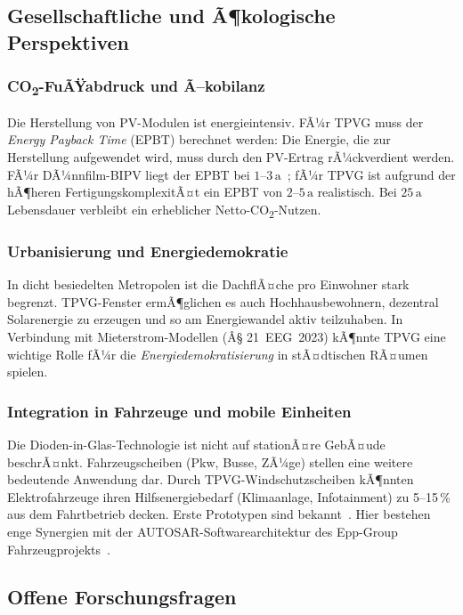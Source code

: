 ﻿\documentclass[a4paper,12pt]{article}
\theoremstyle{definition}
\theoremstyle{remark}
\begin{document}
\subsection{Gesellschaftliche und Ã¶kologische Perspektiven}

\subsubsection{CO\textsubscript{2}-FuÃŸabdruck und Ã–kobilanz}
Die Herstellung von PV-Modulen ist energieintensiv. FÃ¼r TPVG muss
der \emph{Energy Payback Time} (EPBT) berechnet werden: Die
Energie, die zur Herstellung aufgewendet wird, muss durch den PV-Ertrag
rÃ¼ckverdient werden. FÃ¼r DÃ¼nnfilm-BIPV liegt der EPBT bei
$1$--$3\,\mathrm{a}$~\cite{NREL2014}; fÃ¼r TPVG ist aufgrund der
hÃ¶heren FertigungskomplexitÃ¤t ein EPBT von $2$--$5\,\mathrm{a}$
realistisch. Bei $25\,\mathrm{a}$ Lebensdauer verbleibt ein erheblicher
Netto-CO\textsubscript{2}-Nutzen.

\subsubsection{Urbanisierung und Energiedemokratie}
In dicht besiedelten Metropolen ist die DachflÃ¤che pro Einwohner
stark begrenzt. TPVG-Fenster ermÃ¶glichen es auch Hochhausbewohnern,
dezentral Solarenergie zu erzeugen und so am Energiewandel aktiv
teilzuhaben. In Verbindung mit Mieterstrom-Modellen (Â§ 21~EEG~2023)
kÃ¶nnte TPVG eine wichtige Rolle fÃ¼r die \emph{Energiedemokratisierung}
in stÃ¤dtischen RÃ¤umen spielen.

\subsubsection{Integration in Fahrzeuge und mobile Einheiten}
Die Dioden-in-Glas-Technologie ist nicht auf stationÃ¤re GebÃ¤ude
beschrÃ¤nkt. Fahrzeugscheiben (Pkw, Busse, ZÃ¼ge) stellen eine
weitere bedeutende Anwendung dar. Durch TPVG-Windschutzscheiben
kÃ¶nnten Elektrofahrzeuge ihren Hilfsenergiebedarf (Klimaanlage,
Infotainment) zu 5--15\,\% aus dem Fahrtbetrieb decken.
Erste Prototypen sind bekannt~\cite{Toyota2023}. Hier bestehen enge
Synergien mit der AUTOSAR-Softwarearchitektur des Epp-Group
Fahrzeugprojekts~\cite{Epp2026AUTOSAR}.

\subsection{Offene Forschungsfragen}
\end{document}
